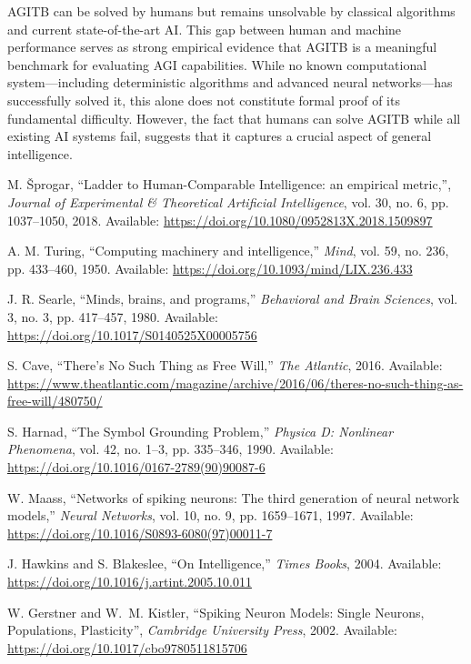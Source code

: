 \documentclass{article}
\begin{document}
AGITB can be solved by humans but remains unsolvable by classical algorithms and current state-of-the-art AI. This gap between human and machine performance serves as strong empirical evidence that AGITB is a meaningful benchmark for evaluating AGI capabilities. While no known computational system—including deterministic algorithms and advanced neural networks—has successfully solved it, this alone does not constitute formal proof of its fundamental difficulty. However, the fact that humans can solve AGITB while all existing AI systems fail, suggests that it captures a crucial aspect of general intelligence.


\begin{thebibliography}{99}

M. Šprogar, 
``Ladder to Human-Comparable Intelligence: an empirical metric,'', 
\textit{Journal of Experimental \& Theoretical Artificial Intelligence},
vol. 30, no. 6, pp. 1037--1050, 2018. Available: \url{https://doi.org/10.1080/0952813X.2018.1509897}

A. M. Turing, 
``Computing machinery and intelligence,'' 
\textit{Mind}, vol. 59, no. 236, pp. 433--460, 1950. Available: \url{https://doi.org/10.1093/mind/LIX.236.433}

J. R. Searle, 
``Minds, brains, and programs,'' 
\textit{Behavioral and Brain Sciences}, vol. 3, no. 3, pp. 417--457, 1980. Available: \url{https://doi.org/10.1017/S0140525X00005756}

S. Cave, 
``There’s No Such Thing as Free Will,''
\textit{The Atlantic},
2016. Available: \url{https://www.theatlantic.com/magazine/archive/2016/06/theres-no-such-thing-as-free-will/480750/}

S. Harnad, 
``The Symbol Grounding Problem,'' 
\textit{Physica D: Nonlinear Phenomena}, vol. 42, no. 1--3, pp. 335--346, 1990. Available: \url{https://doi.org/10.1016/0167-2789(90)90087-6}

W. Maass, 
``Networks of spiking neurons: The third generation of neural network models,'' 
\textit{Neural Networks}, vol. 10, no. 9, pp. 1659--1671, 1997. Available: \url{https://doi.org/10.1016/S0893-6080(97)00011-7}

J. Hawkins and S. Blakeslee,
``On Intelligence,'' 
\textit{Times Books}, 2004. Available: \url{https://doi.org/10.1016/j.artint.2005.10.011}

W. Gerstner and W.~M. Kistler,
``Spiking Neuron Models: Single Neurons, Populations, Plasticity'',
\textit{Cambridge University Press}, 2002. Available:
\url{https://doi.org/10.1017/cbo9780511815706}


\end{thebibliography}
\end{document}
